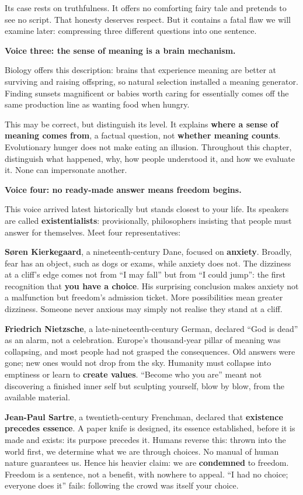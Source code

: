 Its case rests on truthfulness. It offers no comforting fairy tale and pretends to see no script. That honesty deserves respect. But it contains a fatal flaw we will examine later: compressing three different questions into one sentence.

\textbf{Voice three: the sense of meaning is a brain mechanism.}

Biology offers this description: brains that experience meaning are better at surviving and raising offspring, so natural selection installed a meaning generator. Finding sunsets magnificent or babies worth caring for essentially comes off the same production line as wanting food when hungry.

This may be correct, but distinguish its level. It explains \textbf{where a sense of meaning comes from}, a factual question, not \textbf{whether meaning counts}. Evolutionary hunger does not make eating an illusion. Throughout this chapter, distinguish what happened, why, how people understood it, and how we evaluate it. None can impersonate another.

\textbf{Voice four: no ready-made answer means freedom begins.}

This voice arrived latest historically but stands closest to your life. Its speakers are called \textbf{existentialists}: provisionally, philosophers insisting that people must answer for themselves. Meet four representatives:

\textbf{Søren Kierkegaard}, a nineteenth-century Dane, focused on \textbf{anxiety}. Broadly, fear has an object, such as dogs or exams, while anxiety does not. The dizziness at a cliff's edge comes not from ``I may fall'' but from ``I could jump'': the first recognition that \textbf{you have a choice}. His surprising conclusion makes anxiety not a malfunction but freedom's admission ticket. More possibilities mean greater dizziness. Someone never anxious may simply not realise they stand at a cliff.

\textbf{Friedrich Nietzsche}, a late-nineteenth-century German, declared ``God is dead'' as an alarm, not a celebration. Europe's thousand-year pillar of meaning was collapsing, and most people had not grasped the consequences. Old answers were gone; new ones would not drop from the sky. Humanity must collapse into emptiness or learn to \textbf{create values}. ``Become who you are'' meant not discovering a finished inner self but sculpting yourself, blow by blow, from the available material.

\textbf{Jean-Paul Sartre}, a twentieth-century Frenchman, declared that \textbf{existence precedes essence}. A paper knife is designed, its essence established, before it is made and exists: its purpose precedes it. Humans reverse this: thrown into the world first, we determine what we are through choices. No manual of human nature guarantees us. Hence his heavier claim: we are \textbf{condemned} to freedom. Freedom is a sentence, not a benefit, with nowhere to appeal. ``I had no choice; everyone does it'' fails: following the crowd was itself your choice.

